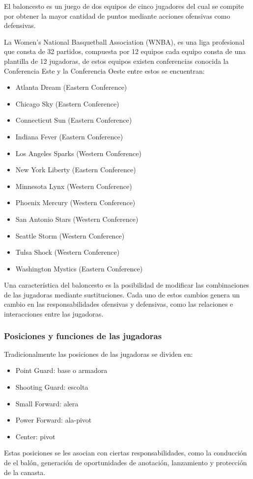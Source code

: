 El baloncesto es un juego de dos equipos de cinco jugadores del cual se compite por obtener la mayor cantidad de puntos mediante acciones ofensivas como defensivas.

La Women's National Basquetball Association (WNBA), es una liga profesional que consta de 32 partidos, compuesta por 12 equipos cada equipo consta de una plantilla de 12 jugadoras, de estos equipos existen conferencias conocida la Conferencia Este y la Conferencia Oeste entre estos se encuentran:
\begin{itemize}[label=\tiny$\blacksquare$]
    \item Atlanta Dream (Eastern Conference)
    \item Chicago Sky (Eastern Conference)
    \item Connecticut Sun (Eastern Conference)
    \item Indiana Fever (Eastern Conference)
    \item Los Angeles Sparks (Western Conference)
    \item New York Liberty (Eastern Conference)
    \item Minnesota Lynx (Western Conference)
    \item Phoenix Mercury (Western Conference)
    \item San Antonio Stars (Western Conference)
    \item Seattle Storm (Western Conference)
    \item Tulsa Shock (Western Conference)
    \item Washington Mystics (Eastern Conference)
\end{itemize}

Una característica del baloncesto es la posibilidad de modificar las combinaciones de las jugadoras mediante sustituciones. Cada uno de estos cambios genera un cambio en las responsabilidades ofensivas y defensivas, como las relaciones e interacciones entre las jugadoras.
\cite{wnba_faq}
\subsubsection{Posiciones y funciones de las jugadoras}
Tradicionalmente las posiciones de las jugadoras se dividen en:
\begin{itemize}
    \item Point Guard: base o armadora
    \item Shooting Guard: escolta
    \item Small Forward: alera
    \item Power Forward: ala-pivot
    \item Center: pivot
\end{itemize}
Estas posiciones se les asocian con ciertas responsabilidades, como la conducción de el balón, generación de oportunidades de anotación, lanzamiento y protección de la canasta.
\cite{achamps_basketball_positions}
